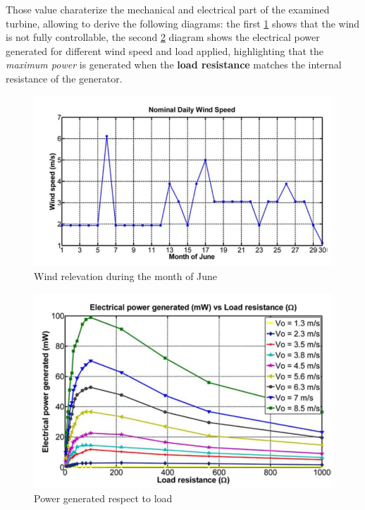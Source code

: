 \documentclass[10pt,a4paper]{report}
\theoremstyle{definition}
\begin{document}
Those value charaterize the mechanical and electrical part of the examined turbine, allowing to derive the following diagrams: the first \ref{wind-relevation} shows that the wind is not fully controllable, the second \ref{power-vs-load} diagram shows the electrical power generated for different wind speed and load applied, highlighting that the \textit{maximum power} is generated when the \textbf{load resistance} matches the internal resistance of the generator.
\begin{figure}[h]
	\centering\includegraphics[scale=0.30]{images/Pasted image 20230506082045.png}
	\caption{Wind relevation during the month of June}
	\label{wind-relevation}
\end{figure}

\begin{figure}[h]
	\centering\includegraphics[scale=0.40]{images/Pasted image 20230506082101.png}
	\caption{Power generated respect to load}
	\label{power-vs-load}
\end{figure}
\end{document}

